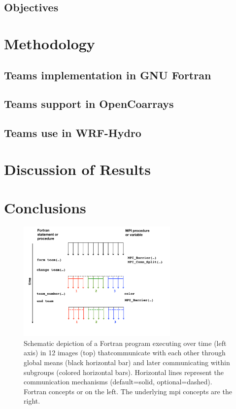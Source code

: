 \subsection{Objectives}

\section{Methodology}
\subsection{Teams implementation in GNU Fortran}
\subsection{Teams support in OpenCoarrays}
\subsection{Teams use in WRF-Hydro}

\section{Discussion of Results}

\section{Conclusions}

\begin{figure}
\includegraphics[width=0.7\textwidth]{figures/teams}
\vspace{-36pt}
\caption{Schematic depiction of a Fortran program executing over time (left axis) in 12 images (top) thatcommunicate with each other through global means (black horizontal bar) and later communicating within subgroups (colored horizontal bars).  Horizontal lines represent the communication mechanisms (default=solid, optional=dashed).  Fortran concepts or on the left.  The underlying \gls{mpi} concepts are the right.}
\end{figure}
%

